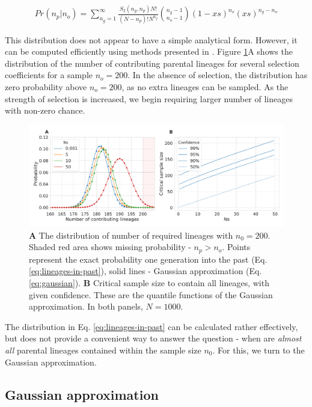 \documentclass[review]{elsarticle}
\begin{document}
\begin{align}
  \label{eq:lineages-in-past}
   Pr(n_p|n_o) = \sum_{n_g=1}^{\infty} \frac{S_2(n_g,n_p) N!}{(N-n_p)! N^{n_g}} \binom{n_g-1}{n_o-1}(1-xs)^{n_o}(xs)^{n_g-n_o}
\end{align}

This distribution does not appear to have a simple analytical form. However, it can be computed
efficiently using methods presented in \citep{ONeill2019}. Figure \ref{fig:combined}A shows the
distribution of the number of contributing parental lineages for several selection coefficients for
a sample $n_o=200$. In the absence of selection, the distribution has zero probability above $n_o=200$,
as no extra lineages can be sampled. As the strength of selection is increased, we begin requiring
larger number of lineages with non-zero chance.

\begin{figure}
  \centering
  \includegraphics[width=\textwidth]{fig/combined.pdf}
  \caption{\textbf{A} The distribution of number of required lineages with $n_0=200$. Shaded red
    area shows missing probability - $n_p > n_o$. Points represent the exact probability one
    generation into the past (Eq. \ref{eq:lineages-in-past}), solid lines - Gaussian approximation
    (Eq. \ref{eq:gaussian}). \textbf{B} Critical sample size to contain all lineages, with given
    confidence. These are the quantile functions of the Gaussian approximation. In both panels,
    $N=1000$.}
  \label{fig:combined}
\end{figure}

The distribution in Eq. \ref{eq:lineages-in-past} can be calculated rather effectively, but does not
provide a convenient way to answer the question - when are \textit{almost all} parental lineages
contained within the sample size $n_0$. For this, we turn to the Gaussian approximation.

\subsection{Gaussian approximation}
\end{document}
